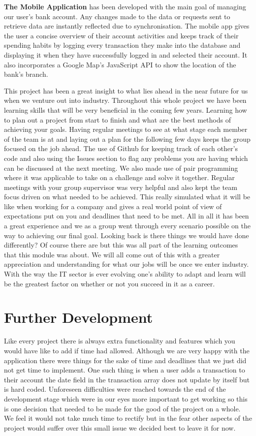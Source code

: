 \textbf{The Mobile Application} has been developed with the main goal of managing our user’s bank account. Any changes made to the data or requests sent to retrieve data are instantly reflected due to synchronisation. The mobile app gives the user a concise overview of their account activities and keeps track of their spending habits by logging every transaction they make into the database and displaying it when they have successfully logged in and selected their account. It also incorporates a Google Map’s JavaScript API to show the location of the bank’s branch. 

This project has been a great insight to what lies ahead in the near future for us when we venture out into industry. Throughout this whole project we have been learning skills that will be very beneficial in the coming few years. Learning how to plan out a project from start to finish and what are the best methods of achieving your goals. Having regular meetings to see at what stage each member of the team is at and laying out a plan for the following few days keeps the group focused on the job ahead. The use of Github for keeping track of each other’s code and also using the Issues section to flag any problems you are having which can be discussed at the next meeting. We also made use of pair programming where it was applicable to take on a challenge and solve it together. Regular meetings with your group supervisor was very helpful and also kept the team focus driven on what needed to be achieved. This really simulated what it will be like when working for a company and gives a real world point of view of expectations put on you and deadlines that need to be met. All in all it has been a great experience and we as a group went through every scenario possible on the way to achieving our final goal. Looking back is there things we would have done differently? Of course there are but this was all part of the learning outcomes that this module was about. We will all come out of this with a greater appreciation and understanding for what our jobs will be once we enter industry. With the way the IT sector is ever evolving one’s ability to adapt and learn will be the greatest factor on whether or not you succeed in it as a career.   

\section{Further Development}

Like every project there is always extra functionality and features which you would have like to add if time had allowed. Although we are very happy with the application there were things for the sake of time and deadlines that we just did not get time to implement. One such thing is when a user adds a transaction to their account the date field in the transaction array does not update by itself but is hard coded. Unforeseen difficulties were reached towards the end of the development stage which were in our eyes more important to get working so this is one decision that needed to be made for the good of the project on a whole. We feel it would not take much time to rectify but in the fear other aspects of the project would suffer over this small issue we decided best to leave it for now.

